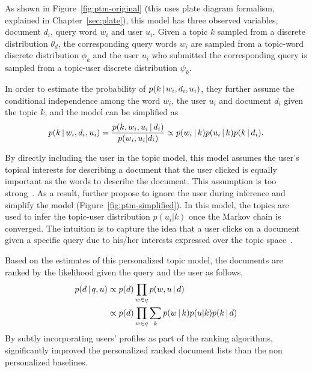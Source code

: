 
As shown in Figure~\ref{fig:ptm-original} (this uses plate diagram
formalism, explained in Chapter~\ref{sec:plate}), this model has three observed
variables, document $d_i$, query word $w_i$ and user $u_i$. Given a topic $k$ sampled
from a discrete distribution $\theta_d$, the corresponding query words $w_i$ are sampled from 
a topic-word discrete distribution $\phi_k$ and the user $u_i$ who submitted the corresponding query 
is sampled from a topic-user discrete distribution $\psi_k$.

In order to estimate the probability of $p(k \, | \, w_i, d_i, u_i)$,
they further assume the conditional independence among the word $w_i$,
the user $u_i$ and document $d_i$ given the topic $k$, and the model
can be simplified as
\begin{align}
p(k \, | \, w_i, d_i, u_i) = \frac{p(k,w_i, u_i  \, | \,  d_i)}{p(w_i, u_i | d_i)} \propto p(w_i \, | \, k) p(u_i \, | \, k) p (k \, | \, d_i).
\end{align}

By directly including the user in the topic model, this model assumes
the user's topical interests for describing a document that the user
clicked is equally important as the words to describe the
document. This assumption is too strong~\citep{Carman-2010}. As a
result, \citet{Harvey-2013} further propose to ignore the user during
inference and simplify the model (Figure~\ref{fig:ptm-simplified}). In
this model, the topics are used to infer the topic-user distribution
$p(u_i|k)$ once the Markov chain is converged. The intuition is to
capture the idea that a user clicks on a document given a specific
query due to his/her interests expressed over the topic
space~\citep{Harvey-2013}.

Based on the estimates of this personalized topic model, the documents are ranked by the likelihood given the query and the user as follows,
\begin{align}
p(d  \, | \,  q,u) &\propto p(d) \prod_{w \in q} p(w, u  \, | \,  d)\\
&\propto p(d) \prod_{w \in q} \sum_k p(w \, | \, k) p(u|k) p(k \, | \, d) \notag
\end{align}
By subtly incorporating users' profiles as part of the ranking algorithms, \citet{Harvey-2013} significantly improved the personalized ranked document lists than the non personalized baselines.

